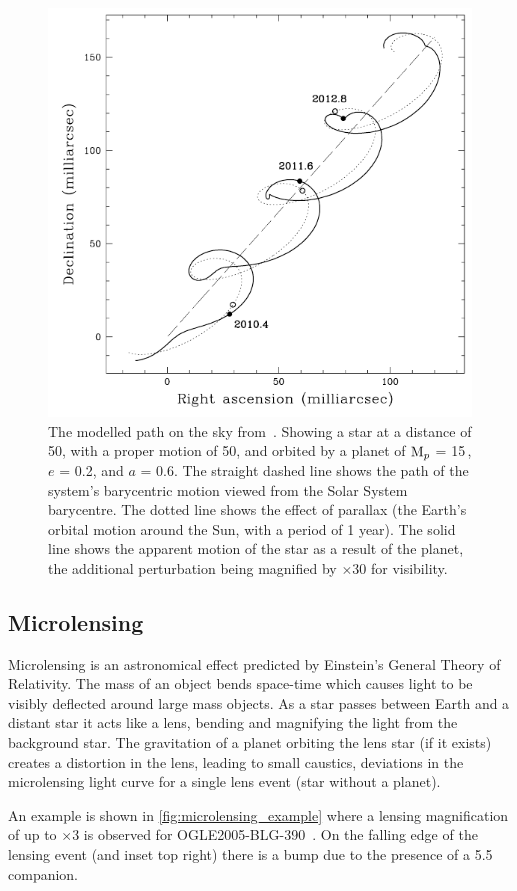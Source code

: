\begin{figure}
    \centering
    \includegraphics[width=0.5\linewidth]{./figures/introduction/Astrometry_Perryman2000.png}
    \caption{The modelled path on the sky from~\citet{perryman_extrasolar_2000}.
        Showing a star at a distance of 50\pc, with a proper motion of 50\masperyr{}, and orbited by a planet of $\textrm{M}_{p}$ = 15\,\Mjup{}, $e$ = 0.2, and $a$ = 0.6\AU{}.
        The straight dashed line shows the path of the system's barycentric motion viewed from the Solar System barycentre.
        The dotted line shows the effect of parallax (the Earth's orbital motion around the Sun, with a period of 1 year).
        The solid line shows the apparent motion of the star as a result of the planet, the additional perturbation being magnified by $\times 30$ for visibility.}
    \label{fig:astrometry_perryman}
\end{figure}


\subsection{Microlensing}
\label{subsec:microlensing}
Microlensing is an astronomical effect predicted by Einstein's General Theory of Relativity.
The mass of an object bends space-time which causes light to be visibly deflected around large mass objects.
As a star passes between Earth and a distant star it acts like a lens, bending and magnifying the light from the background star.
The gravitation of a planet orbiting the lens star (if it exists) creates a distortion in the lens, leading to small caustics, deviations in the microlensing light curve for a single lens event (star without a planet).

An example is shown in \cref{fig:microlensing_example} where a lensing magnification of up to $\times3$ is observed for {OGLE2005-BLG-390}~\citep{beaulieu_discovery_2006}.
On the falling edge of the lensing event (and inset top right) there is a bump due to the presence of a 5.5\,\Mjup{} companion.

